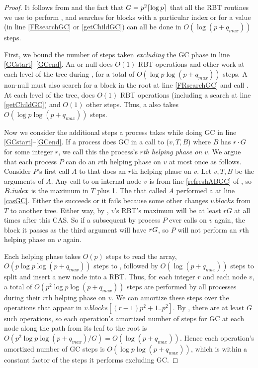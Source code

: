 \begin{proof}
It follows from  and the fact that $G=p^2\lceil \log p \rceil$
that all the RBT routines we use to perform ,  and searches for
blocks with a particular index or for a  value (in line \ref{FRsearchGC} or \ref{getChildGC}) can all be done in $O(\log(p+q_{max}))$ steps.

First, we bound the number of steps taken \emph{excluding} the GC phase in line \ref{GCstart}--\ref{GCend}.
An  or null  does $O(1)$ RBT operations and other work at each level of the tree during ,
for a total of $O(\log p \log(p+q_{max}))$ steps.
A non-null  must also search for a block in the root at line \ref{FRsearchGC}
and call .  At each level of the tree,  does $O(1)$ RBT operations (including a search at line \ref{getChildGC}) and $O(1)$ other steps.
Thus, a  also takes $O(\log p \log(p+q_{max}))$ steps.

Now we consider the additional steps a process takes while doing GC in line \ref{GCstart}--\ref{GCend}.
If a process does GC in a call to ($v,T,B$) where $B$ has  $r\cdot G$ for some integer $r$, we call this the process's \emph{$r$th helping phase on $v$}.
We argue that each process $P$ can do an $r$th helping phase on $v$ at most once as follows.
Consider $P$'s first call $A$ to  that does an $r$th helping phase on $v$.
Let $v,T,B$ be the arguments of $A$.
Any call to  on internal node $v$ is from line \ref{refreshABGC} of , so $B.\mbox{\textit{index}}$
is the maximum  in $T$ plus 1.
The  that called $A$ performed a  at line \ref{casGC}.  Either the  succeeds
or it fails because 
some other  changes $v.blocks$ from $T$ to another tree.
Either way, by , $v$'s RBT's maximum  will be at least $rG$ at all times
after this CAS.
So if a subsequent  by process $P$ 
ever calls  on $v$ again, the block it passes as the third argument
will have $\index>rG$, so $P$ will not perform an $r$th helping phase on $v$ again.

Each helping phase takes $O(p)$ steps to read the  array,
$O(p \log p \log(p+q_{max}))$ steps to ,
followed by $O(\log(p+q_{max}))$ steps to split and insert a new node into a RBT.
Thus, for each integer $r$ and each node $v$, a total of $O(p^2\log p\log(p+q_{max}))$ steps
are performed by all processes during their $r$th helping phase on $v$.
We can amortize these steps over the operations that appear in 
$v.blocks[(r-1)p^2+1..p^2]$.
By , there are at least $G$ such operations, 
so each operation's amortized number of steps for GC at each node along the path from its leaf to the root
is $O(p^2\log p\log(p+q_{max})/G)=O(\log(p+q_{max}))$.
Hence each operation's amortized number of GC steps is $O(\log p\log(p+q_{max}))$, which is
within a constant factor of the steps it performs excluding GC.
\end{proof}


